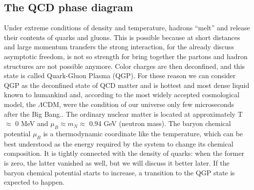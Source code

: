 \documentclass[12pt,a4paper]{book}
\begin{document}
	\subsection{The QCD phase diagram}
	Under extreme conditions of density and temperature, hadrons “melt” and release their contents of quarks and gluons. This is possible because at short distances and large momentum transfers the strong interaction, for the already discuss asymptotic freedom, is not so strength for bring together the partons and hadron structures are not possible anymore. Color charges are then deconfined, and this state is called Quark-Gluon Plasma (QGP). For these reason we can consider QGP as the deconfined state of QCD matter and is hottest and most dense liquid known to humankind and, according to the most widely accepted cosmological model, the $\Lambda$CDM, were the condition of our universe only few microseconds after the Big Bang.\cite{QCDPhase-Diagram}. The ordinary nuclear matter is located at approximately T $\approx$ 0 MeV and $\mu_B \approx m_N \approx$ 0.94 GeV (neutron mass). The baryon chemical potential $\mu_B$ is a thermodynamic coordinate like the temperature, which can be best understood as the energy required by the system to change its chemical composition. It is tightly connected with the density of quarks: when the former is zero, the latter vanished as well, but we will discuss it better later. If the baryon chemical potential starts to increase, a transition to the QGP state is expected to happen.
	
\end{document}

